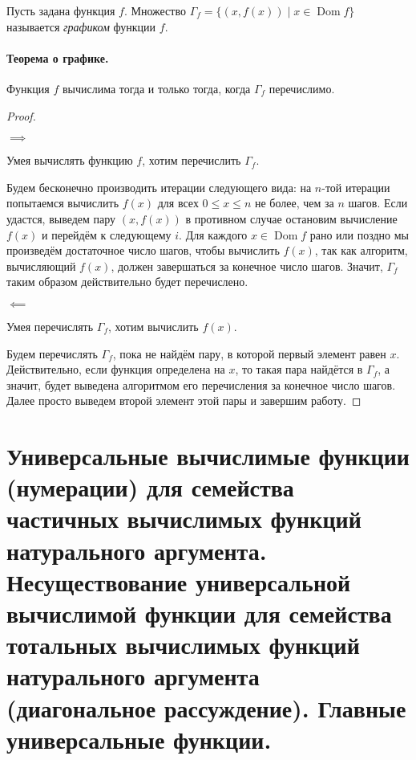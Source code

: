 \documentclass{article}
\begin{document}
    \begin{definition}
        Пусть задана функция \(f\). Множество \(\Gamma_f = \{(x, f(x)) \mid x \in \operatorname{Dom} f\}\)
        называется \textit{графиком} функции \(f\).
    \end{definition}

    \paragraph{Теорема о графике.} Функция \(f\) вычислима тогда и только тогда, когда \(\Gamma_f\)
    перечислимо.
    \begin{proof}\

        \(\implies\)

        Умея вычислять функцию \(f\), хотим перечислить \(\Gamma_f\).

        Будем бесконечно производить итерации следующего вида: на \(n\)-той итерации попытаемся
        вычислить \(f(x)\) для всех \(0 \leqslant x \leqslant n\) не более, чем за \(n\) шагов.
        Если удастся, выведем пару \((x, f(x))\) в противном случае остановим вычисление \(f(x)\)
        и перейдём к следующему \(i\). Для каждого \(x \in \operatorname{Dom} f\) рано или поздно мы
        произведём достаточное число шагов, чтобы вычислить \(f(x)\), так как алгоритм, вычисляющий
        \(f(x)\), должен завершаться за конечное число шагов. Значит, \(\Gamma_f\) таким образом
        действительно будет перечислено.

        \(\impliedby\)

        Умея перечислять \(\Gamma_f\), хотим вычислить \(f(x)\).

        Будем перечислять \(\Gamma_f\), пока не найдём пару, в которой первый элемент равен \(x\).
        Действительно, если функция определена на \(x\), то такая пара найдётся в \(\Gamma_f\),
        а значит, будет выведена алгоритмом его перечисления за конечное число шагов. Далее просто
        выведем второй элемент этой пары и завершим работу.

    \end{proof}

    \section{Универсальные вычислимые функции (нумерации) для семейства частичных вычислимых
    функций натурального аргумента. Несуществование универсальной вычислимой функции для
    семейства тотальных вычислимых функций натурального аргумента (диагональное рассуждение).
    Главные универсальные функции.}
\end{document}
